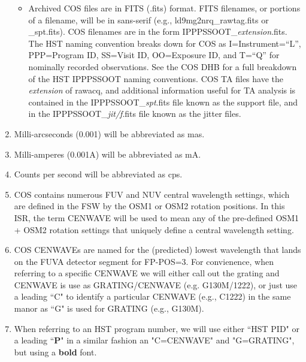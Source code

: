 \begin{enumerate}
{\begin{itemize}
			\item{Archived COS files are in FITS (.fits) format. FITS filenames, or portions of a filename, will be in {\sf sans-serif} (e.g., {\sf ld9mg2nrq\_rawtag.fits} or {\sf \_spt.fits}).
			COS filenames are in the form {\sf IPPPSSOOT\_{\it extension}.fits}.
			The HST naming convention breaks down for COS as I=Instrument=``L'', PPP=Program ID, SS=Visit ID, OO=Exposure ID,
			and T=``Q'' for nominally recorded observations. See the COS DHB for a full breakdown of the HST IPPPSSOOT naming conventions.
			COS TA files have the {\it extension} of {\sf rawacq}, and additional
			information useful for TA analysis is contained in the {\sf IPPPSSOOT\_{\it spt}.fits} file known as the support file,
			and in the {\sf IPPPSSOOT\_{\it jit/f}.fits} file known as the jitter files.}
		\end{itemize}
	}
	\item{Milli-arcseconds (0.001\arcsec) will be abbreviated as mas.}
	\item{Milli-amperes (0.001A) will be abbreviated as mA.}
	\item{Counts per second will be abbreviated as cps.}
	\item{COS contains numerous FUV and NUV central wavelength settings, which are defined in the FSW by the OSM1 or OSM2 rotation positions.
	In this ISR, the term CENWAVE will be used to mean any of the pre-defined OSM1 + OSM2 rotation settings that uniquely define a central wavelength setting.}
	\item{COS CENWAVEs are named for the (predicted) lowest wavelength that lands on the FUVA detector segment for FP-POS=3. For convienence, when referring to
	a specific CENWAVE we will either call out the grating and CENWAVE is use as GRATING/CENWAVE (e.g. G130M/1222), or just use a leading ``C" to identify a particular CENWAVE (e.g., C1222) in the same manor as ``G" is used for GRATING (e.g., G130M).}
	\item{When referring to an HST program number, we will use either ``HST PID" or a leading ``{\bf P}" in a similar fashion an "C=CENWAVE" and "G=GRATING", but using a {\bf bold} font.}

\end{enumerate}
